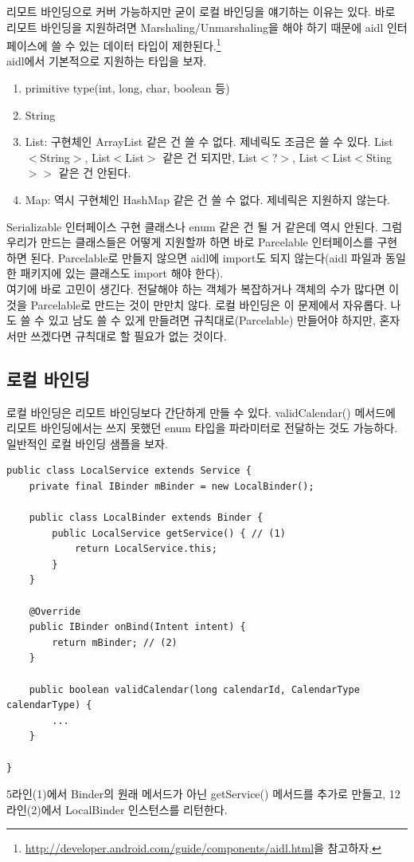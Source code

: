 리모트 바인딩으로 커버 가능하지만 굳이 로컬 바인딩을 얘기하는 이유는 있다. 바로 리모트 바인딩을 지원하려면 Marshaling/Unmarshaling을 해야 하기 때문에 
aidl 인터페이스에 쓸 수 있는 데이터 타입이 제한된다.\footnote{\url{http://developer.android.com/guide/components/aidl.html}을 참고하자.}\\

aidl에서 기본적으로 지원하는 타입을 보자. 
\begin{enumerate}
\item primitive type(int, long, char, boolean 등)
\item String
\item List: 구현체인 ArrayList 같은 건 쓸 수 없다. 제네릭도 조금은 쓸 수 있다. List$<$String$>$, List$<$List$>$ 같은 건 되지만, List$<$?$>$, List$<$List$<$Sting$>>$ 같은 건 안된다.
\item Map: 역시 구현체인 HashMap 같은 건 쓸 수 없다. 제네릭은 지원하지 않는다.
\end{enumerate}
Serializable 인터페이스 구현 클래스나 enum 같은 건 될 거 같은데 역시 안된다.
그럼 우리가 만드는 클래스들은 어떻게 지원할까 하면 바로 Parcelable 인터페이스를 구현하면 된다. 
Parcelable로 만들지 않으면 aidl에 import도 되지 않는다(aidl 파일과 동일한 패키지에 있는 클래스도 import 해야 한다).\\

여기에 바로 고민이 생긴다. 전달해야 하는 객체가 복잡하거나 객체의 수가 많다면 이것을 Parcelable로 만드는 것이 만만치 않다.
로컬 바인딩은 이 문제에서 자유롭다. 나도 쓸 수 있고 남도 쓸 수 있게 만들려면 규칙대로(Parcelable) 만들어야 하지만, 혼자서만 쓰겠다면 규칙대로 할 필요가 없는 것이다.\\

\subsection{로컬 바인딩}
로컬 바인딩은 리모트 바인딩보다 간단하게 만들 수 있다.
validCalendar() 메서드에 리모트 바인딩에서는 쓰지 못했던 enum 타입을 파라미터로 전달하는 것도 가능하다. 일반적인 로컬 바인딩 샘플을 보자.
\begin{lstlisting}[frame=single]
public class LocalService extends Service {
	private final IBinder mBinder = new LocalBinder();

	public class LocalBinder extends Binder {
		public LocalService getService() { // (1)
			return LocalService.this;
		}
	}

	@Override
	public IBinder onBind(Intent intent) {
		return mBinder; // (2)
	}

	public boolean validCalendar(long calendarId, CalendarType calendarType) {
		...
	}

}
\end{lstlisting}
5라인(1)에서 Binder의 원래 메서드가 아닌 getService() 메서드를 추가로 만들고, 12라인(2)에서 LocalBinder 인스턴스를 리턴한다.\\

